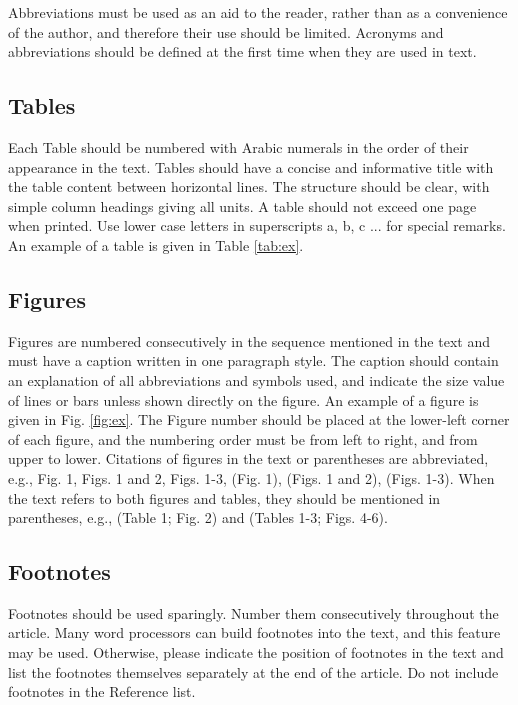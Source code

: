 \documentclass[final,3p,times,twocolumn]{elsarticle}
\begin{document}
Abbreviations must be used as an aid to the reader, rather than as a convenience of the author, and therefore their use should be limited. 
Acronyms and abbreviations should be defined at the first time when they are used in text.

\subsection{Tables}
Each Table should be numbered with Arabic numerals in the order of their appearance in the text. 
Tables should have a concise and informative title with the table content between horizontal lines. 
The structure should be clear, with simple column headings giving all units. 
A table should not exceed one page when printed. Use lower case letters in superscripts a, b, c ... for special remarks. 
An example of a table is given in Table \ref{tab:ex}.

\subsection{Figures}
Figures are numbered consecutively in the sequence mentioned in the text and must have a caption written in one paragraph style. 
The caption should contain an explanation of all abbreviations and symbols used, and indicate the size value of lines or bars unless shown directly on the figure. 
An example of a figure is given in Fig. \ref{fig:ex}. 
The Figure number should be placed at the lower-left corner of each figure, and the numbering order must be from left to right, and from upper to lower. 
Citations of figures in the text or parentheses are abbreviated, e.g., Fig. 1, Figs. 1 and 2, Figs. 1-3, (Fig. 1), (Figs. 1 and 2), (Figs. 1-3). 
When the text refers to both figures and tables, they should be mentioned in parentheses, e.g., (Table 1; Fig. 2) and (Tables 1-3; Figs. 4-6).

\subsection{Footnotes}
Footnotes should be used sparingly. Number them consecutively throughout the article. 
Many word processors can build footnotes into the text, and this feature may be used. 
Otherwise, please indicate the position of footnotes in the text and list the footnotes themselves separately at the end of the article. 
Do not include footnotes in the Reference list.


\end{document}
